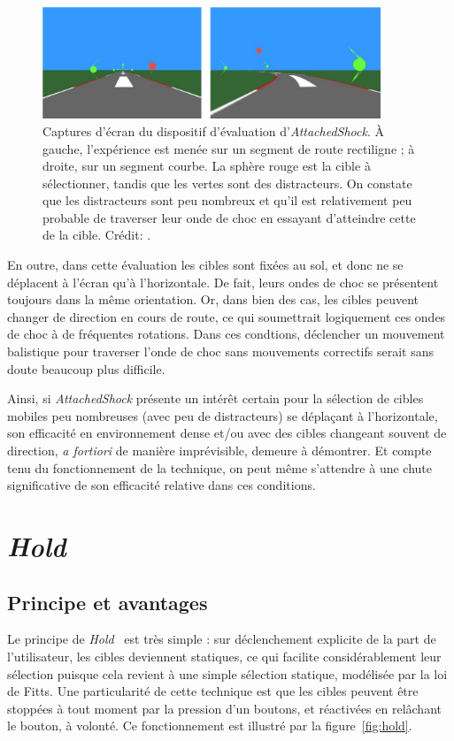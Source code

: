 	\begin{figure}[!htb]
		\centering
		\includegraphics[width=0.9\textwidth]{figures/ch2/asDensity}
		\caption[\emph{AttachedShock}, densité de cibles]{Captures d'écran du dispositif d'évaluation d'\emph{AttachedShock}. À gauche, l'expérience est menée sur un segment de route rectiligne ; à droite, sur un segment courbe. La sphère rouge est la cible à sélectionner, tandis que les vertes sont des distracteurs. On constate que les distracteurs sont peu nombreux et qu'il est relativement peu probable de \og traverser \fg{} leur onde de choc en essayant d'atteindre cette de la cible. Crédit: \cite{you2012attachedshock}.}
		\label{fig:asDensity}
	\end{figure}
	
	En outre, dans cette évaluation les cibles sont fixées au sol, et donc ne se déplacent à l'écran qu'à l'horizontale. De fait, leurs ondes de choc se présentent toujours dans la même orientation. Or, dans bien des cas, les cibles peuvent changer de direction en cours de route, ce qui soumettrait logiquement ces ondes de choc à de fréquentes rotations. Dans ces condtions, déclencher un mouvement balistique pour traverser l'onde de choc sans mouvements correctifs serait sans doute beaucoup plus difficile.
	
	Ainsi, si \emph{AttachedShock} présente un intérêt certain pour la sélection de cibles mobiles peu nombreuses (avec peu de distracteurs) se déplaçant à l'horizontale, son efficacité en environnement dense et/ou avec des cibles changeant souvent de direction, \emph{a fortiori} de manière imprévisible, demeure à démontrer. Et compte tenu du fonctionnement de la technique, on peut même s'attendre à une chute significative de son efficacité relative dans ces conditions.

\section{\emph{Hold}}
	\subsection{Principe et avantages}
	Le principe de \emph{Hold}~\cite{hajri2011moving} est très simple : sur déclenchement explicite de la part de l'utilisateur, les cibles deviennent statiques, ce qui facilite considérablement leur sélection puisque cela revient à une simple sélection statique, modélisée par la loi de Fitts. Une particularité de cette technique est que les cibles peuvent être stoppées à tout moment par la pression d'un boutons, et \og réactivées \fg{} en relâchant le bouton, à volonté. Ce fonctionnement est illustré par la figure~\ref{fig:hold}.
	
